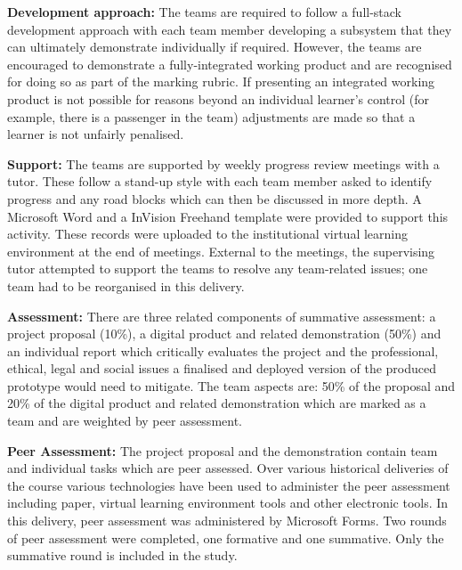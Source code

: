 \documentclass[sigconf, anonymous=false]{acmart}
\begin{document}
\textbf{Development approach:}
The teams are required to follow a full-stack development approach
with each team member developing a subsystem that they can ultimately
demonstrate individually if required. However, the teams are
encouraged to demonstrate a fully-integrated working product and are
recognised for doing so as part of the marking rubric. If presenting
an integrated working product is not possible for reasons beyond an
individual learner's control (for example, there is a passenger in the
team) adjustments are made so that a learner is not unfairly
penalised.

\textbf{Support:}
The teams are supported by weekly progress review meetings with a
tutor. These follow a stand-up style with each team member asked to
identify progress and any road blocks which can then be discussed in
more depth. A Microsoft Word and a InVision Freehand template were
provided to support this activity. These records were uploaded to the
institutional virtual learning environment at the end of
meetings. External to the meetings, the supervising tutor attempted to
support the teams to resolve any team-related issues; one team had to
be reorganised in this delivery.

\textbf{Assessment:}
There are three related components of summative assessment: a project
proposal (10\%), a digital product and related demonstration (50\%)
and an individual report which critically evaluates the project and
the professional, ethical, legal and social issues a finalised and
deployed version of the produced prototype would need to mitigate. The
team aspects are: 50\% of the proposal and 20\% of the digital product
and related demonstration which are marked as a team and are weighted
by peer assessment.

\textbf{Peer Assessment:}
The project proposal and the demonstration contain team and individual
tasks which are peer assessed. Over various historical deliveries of the
course various technologies have been used to administer the peer
assessment including paper, virtual learning environment tools and
other electronic tools. In this delivery, peer assessment was
administered by Microsoft Forms. Two rounds of peer assessment were
completed, one formative and one summative. Only the summative round
is included in the study.
\end{document}
